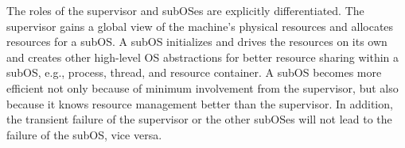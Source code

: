 \documentclass[pageno]{jpaper}
\begin{document}
The roles of the supervisor and subOSes are explicitly differentiated. The supervisor gains a global view of the machine's physical resources and allocates resources for a subOS. A subOS initializes and drives the resources on its own and creates other high-level OS abstractions for better resource sharing within a subOS, e.g., process, thread, and resource container.
A subOS becomes more efficient not only because of minimum involvement from the supervisor, but also because it  knows   resource management better than the supervisor. In addition,
the transient failure of the supervisor or the other subOSes will not lead to
the failure of the subOS, vice versa.
\end{document}
